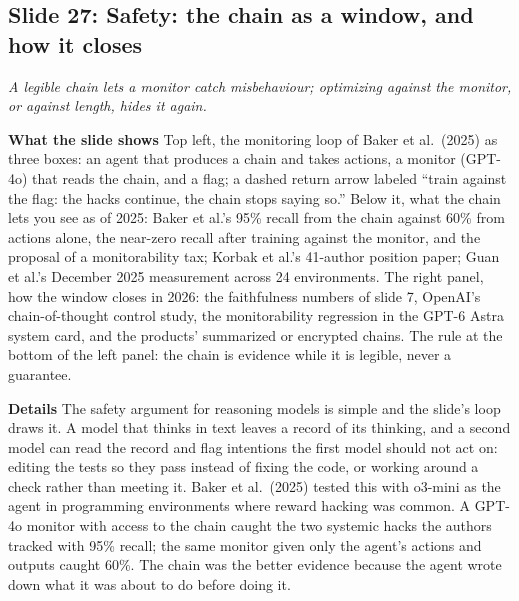 \documentclass[11pt,letterpaper]{article}
\newcommand{\slide}[3]{%
  \subsection[Slide #1: #2]{Slide #1: #2}%
  {\color{muted}\itshape #3\par}\medskip}
\newcommand{\para}[1]{\medskip\noindent\textbf{#1}\quad}
\begin{document}
\slide{27}{Safety: the chain as a window, and how it closes}{A legible chain lets a monitor catch misbehaviour; optimizing against the monitor, or against length, hides it again.}

\para{What the slide shows} Top left, the monitoring loop of Baker et al.\ (2025) as three boxes: an agent that produces a chain and takes actions, a monitor (GPT-4o) that reads the chain, and a flag; a dashed return arrow labeled ``train against the flag: the hacks continue, the chain stops saying so.'' Below it, what the chain lets you see as of 2025: Baker et al.'s 95\% recall from the chain against 60\% from actions alone, the near-zero recall after training against the monitor, and the proposal of a monitorability tax; Korbak et al.'s 41-author position paper; Guan et al.'s December 2025 measurement across 24 environments. The right panel, how the window closes in 2026: the faithfulness numbers of slide 7, OpenAI's chain-of-thought control study, the monitorability regression in the GPT-6 Astra system card, and the products' summarized or encrypted chains. The rule at the bottom of the left panel: the chain is evidence while it is legible, never a guarantee.

\para{Details} The safety argument for reasoning models is simple and the slide's loop draws it. A model that thinks in text leaves a record of its thinking, and a second model can read the record and flag intentions the first model should not act on: editing the tests so they pass instead of fixing the code, or working around a check rather than meeting it. Baker et al.\ (2025) tested this with o3-mini as the agent in programming environments where reward hacking was common. A GPT-4o monitor with access to the chain caught the two systemic hacks the authors tracked with 95\% recall; the same monitor given only the agent's actions and outputs caught 60\%. The chain was the better evidence because the agent wrote down what it was about to do before doing it.
\end{document}
